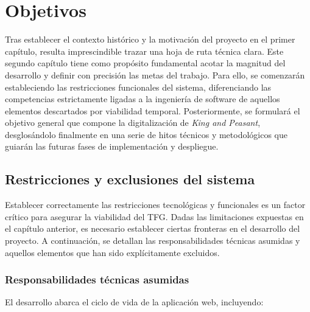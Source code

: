 \chapter{Objetivos}

\begin{abstract}
Este capítulo establece el marco operativo y las metas fundamentales del TFG. En primer lugar, se definen las restricciones y exclusiones del sistema, delimitando las responsabilidades técnicas asumidas. A continuación, se formula el objetivo general centrado en la adaptación digital de \textit{King and Peasant}, para finalmente desglosarlo en un conjunto de objetivos específicos técnicos, de diseño y metodológicos que servirán como hitos medibles a lo largo del ciclo de desarrollo.
\end{abstract}

Tras establecer el contexto histórico y la motivación del proyecto en el primer capítulo, resulta imprescindible trazar una hoja de ruta técnica clara. Este segundo capítulo tiene como propósito fundamental acotar la magnitud del desarrollo y definir con precisión las metas del trabajo. Para ello, se comenzarán estableciendo las restricciones funcionales del sistema, diferenciando las competencias estrictamente ligadas a la ingeniería de software de aquellos elementos descartados por viabilidad temporal. Posteriormente, se formulará el objetivo general que compone la digitalización de \textit{King and Peasant}, desglosándolo finalmente en una serie de hitos técnicos y metodológicos que guiarán las futuras fases de implementación y despliegue.

\section{Restricciones y exclusiones del sistema}

Establecer correctamente las restricciones tecnológicas y funcionales es un factor crítico para asegurar la viabilidad del TFG. Dadas las limitaciones expuestas en el capítulo anterior, es necesario establecer ciertas fronteras en el desarrollo del proyecto. A continuación, se detallan las responsabilidades técnicas asumidas y aquellos elementos que han sido explícitamente excluidos.

\subsection{Responsabilidades técnicas asumidas}

El desarrollo abarca el ciclo de vida de la aplicación web, incluyendo:

